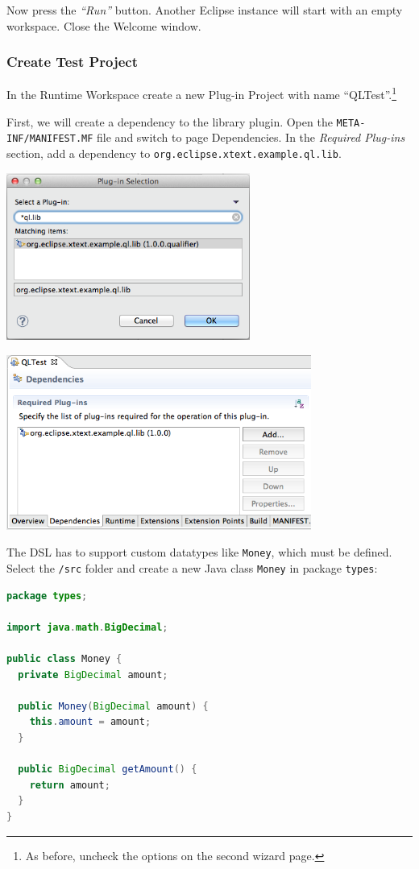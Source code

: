 Now press the \emph{``Run''} button. Another Eclipse instance will start with an
empty workspace. Close the Welcome window.


\subsubsection{Create Test Project}

In the Runtime Workspace create a new Plug-in Project with name
``QLTest''.\footnote{As before, uncheck the options on the second wizard page.}

First, we will create a dependency to the library plugin. Open the
\texttt{META-INF/MANIFEST.MF} file and switch to page Dependencies. In the \emph{Required
Plug-ins} section, add a dependency to \texttt{org.eclipse.xtext.example.ql.lib}.

\includegraphics[width=8cm]{./images/chapter01/AddDependency_01.png}

\includegraphics[width=10cm]{./images/chapter01/AddDependency_02.png}

The DSL has to support custom datatypes like \texttt{Money}, which must be
defined. Select the \texttt{/src} folder and create a new Java class \texttt{Money} in package
\texttt{types}:
\begin{lstlisting}[language=Java]
package types;

import java.math.BigDecimal;

public class Money {
  private BigDecimal amount;

  public Money(BigDecimal amount) {
    this.amount = amount;
  }

  public BigDecimal getAmount() {
    return amount;
  }
}
\end{lstlisting}
 

